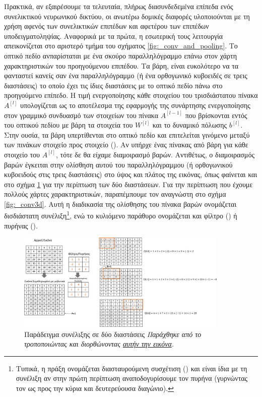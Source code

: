 Πρακτικά, αν εξαιρέσουμε τα τελευταία, πλήρως διασυνδεδεμένα επίπεδα ενός συνελικτικού νευρωνικού δικτύου, οι ανωτέρω δομικές διαφορές υλοποιούνται με τη χρήση αφενός των συνελικτικών επιπέδων και αφετέρου των επιπέδων υποδειγματοληψίας. Αναφορικά με τα πρώτα, η εσωτερική τους λειτουργία απεικονίζεται στο αριστερό τμήμα του σχήματος \ref{fig:_conv_and_pooling}.
Το οπτικό πεδίο ανπαρίσταται με ένα σκούρο παραλληλόγραμμο επάνω στον χάρτη χαρακτηριστικών του προηγούμενου επιπέδου. Τα βάρη, είναι ευκολότερο να τα φανταστεί κανείς σαν ένα παραλληλόγραμμο (ή ένα ορθογωνικό κυβοειδές σε τρεις διαστάσεις) το οποίο έχει τις ίδιες διαστάσεις με το οπτικό πεδίο πάνω στο προηγούμενο επίπεδο. Η τιμή ενεργοποίησης κάθε στοιχείου του τρισδιάστατου πίνακα $A^{[l]}$ υπολογίζεται ως το αποτέλεσμα της εφαρμογής της συνάρτησης ενεργοποίησης στον γραμμικό συνδυασμό των στοιχείων του πίνακα $A^{[l-1]}$ που βρίσκονται εντός του οπτικού πεδίου με βάρη τα στοιχεία του $W^{[l]}$ και το δυναμικό πόλωσης $b^{[l]}$. Στην ουσία, τα βάρη υπερτίθενται στο οπτικό πεδίο και επιτελείται γινόμενο μεταξύ των πινάκων στοιχείο προς στοιχείο (). Αν υπήρχε ένας πίνακας από βάρη για κάθε στοιχείο του $A^{[l]}$, τότε δε θα είχαμε διαμοιρασμό βαρών. Αντιθέτως, ο διαμοιρασμός βαρών έγκειται στην ολίσθηση αυτού του παραλληλόγραμμου (ή ορθογωνικού κυβοειδούς στις τρεις διαστάσεις) στο ύψος και πλάτος της εικόνας, όπως φαίνεται και στο σχήμα \ref{fig:_conv2d} για την περίπτωση των δύο διαστάσεων. Για την περίπτωση που έχουμε πολλούς χάρτες χαρακτηριστικών, παραπέμπουμε τον αναγνώστη στο σχήμα \ref{fig:_conv3d}. Αυτή η διαδικασία της ολίσθησης του πίνακα βαρών ονομάζεται δισδιάστατη συνέλιξη\footnote{Τυπικά, η πράξη ονομάζεται διασταυρούμενη συσχέτιση () και είναι ίδια με τη συνέλιξη αν στην πρώτη περίπτωση αναποδογυρίσουμε τον πυρήνα (γυρνώντας τον ως προς την κύρια και δευτερεύουσα διαγώνιο).}, ενώ το κυλιόμενο παράθυρο ονομάζεται και φίλτρο () ή πυρήνας (). \par

\begin{figure}[h]
  \centering
  \includegraphics[width=0.9\textwidth]{images/chapter theoritical background/convolve_example_step_1_greek.pdf}
  \caption{Παράδειγμα συνέλιξης σε δύο διαστάσεις \textit{Παράχθηκε από το \href{https://inkscape.org/}{} τροποποιώντας και διορθώνοντας \href{https://empirischtech.at/blog-image-filters}{αυτήν την εικόνα}.}}
  \label{fig:_conv2d}
\end{figure}

